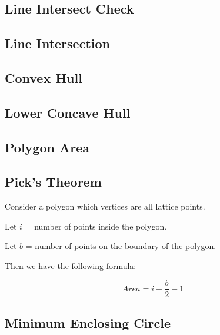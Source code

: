 \documentclass[a4paper,10pt,twocolumn,oneside]{article}
\begin{document}
\subsection{Line Intersect Check}


\subsection{Line Intersection}


\subsection{Convex Hull}


\subsection{Lower Concave Hull}


\subsection{Polygon Area}


\subsection{Pick's Theorem}
Consider a polygon which vertices are all lattice points.

Let $i$ = number of points inside the polygon.

Let $b$ = number of points on the boundary of the polygon.

Then we have the following formula:

$$
Area = i + \frac{b}{2} - 1
$$

\subsection{Minimum Enclosing Circle}


% 
\end{document}
